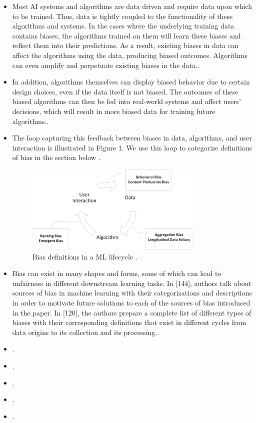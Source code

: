 \documentclass[12pt, a4paper, oneside]{book}   	%
\begin{document}
			\begin{itemize}
				\item Most AI systems and algorithms are data driven and require data upon which to be trained. Thus, data is tightly coupled to the functionality of these algorithms and systems. In the cases where the underlying training data contains biases, the algorithms trained on them will learn these biases and reflect them into their predictions. As a result, existing biases in data can affect the algorithms using the data, producing biased outcomes. Algorithms can even amplify and perpetuate existing biases in the data.\autocite{Mehrabi_2021}.
				\item In addition, algorithms themselves can display biased behavior due to certain design choices, even if the data itself is not biased. The outcomes of these biased algorithms can then be fed into real-world systems and affect users’ decisions, which will result in more biased data for training future algorithms.\autocite{Mehrabi_2021}.
				\item The loop capturing this feedback between biases in data, algorithms, and user interaction is illustrated in Figure 1. We use this loop to categorize definitions of bias in the section below \autocite{Mehrabi_2021}.
				\begin{figure}[H]
					\centering
					\includegraphics[width=0.8\textwidth]{figures/BiasCategoriesInMLLifecycle.png}
					\caption{Bias definitions in a ML lifecycle \autocite{Mehrabi_2021}.}
					\label{fig:example}
				\end{figure}
				\item Bias can exist in many shapes and forms, some of which can lead to unfairness in different downstream learning tasks. In [144], authors talk about sources of bias in machine learning with their categorizations and descriptions in order to motivate future solutions to each of the sources of bias introduced in the paper. In [120], the authors prepare a complete list of different types of biases with their corresponding definitions that exist in different cycles from data origins to its collection and its processing.\autocite{Mehrabi_2021}.
				\item \autocite{Mehrabi_2021}.
				\item \autocite{Mehrabi_2021}.
				\item \autocite{Mehrabi_2021}.
				\item \autocite{Mehrabi_2021}.
				\item \autocite{Mehrabi_2021}.
			\end{itemize}	
			
\end{document}
